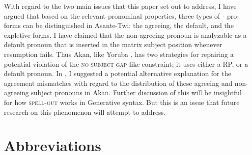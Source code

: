 \documentclass[output=paper]{LSP/langsci}
\begin{document}
With regard to the two main issues that this paper set out to address, I have argued that based on the relevant pronominal properties, three types of \textit{\eer-} pro-forms can be distinguished in Asante-Twi: the agreeing, the default, and the expletive forms. I have claimed that the non-agreeing pronoun is analyzable as a default pronoun that is inserted in the matrix subject position whenever resumption fails. Thus Akan, like Yoruba \citep{Adesola10}, has two strategies for repairing a potential violation of the \textsc{no-subject-gap}-like constraint; it uses either a RP, or a default pronoun. In , I suggested a potential alternative explanation for the agreement mismatches with regard to the distribution of these agreeing and non-agreeing subject pronouns in Akan. Further discussion of this will be insightful for how \textsc{spell-out} works in Generative syntax. But this is an issue that  future research on this phenomenon will attempt to address.


\section*{Abbreviations}
\end{document}
